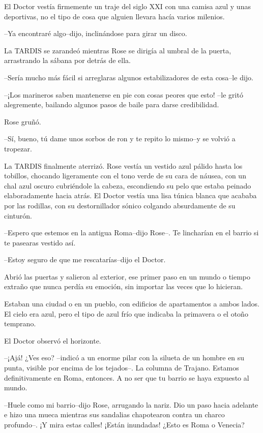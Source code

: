 El Doctor vestía firmemente un traje del siglo XXI con una camisa azul y
unas deportivas, no el tipo de cosa que alguien llevara hacía varios
milenios.

--Ya encontraré algo--dijo, inclinándose para girar un disco.

La TARDIS se zarandeó mientras Rose se dirigía al umbral de la puerta,
arrastrando la sábana por detrás de ella.

--Sería mucho más fácil si arreglaras algunos estabilizadores de esta
cosa--le dijo.

--¡Los marineros saben mantenerse en pie con cosas peores que esto! --le
gritó alegremente, bailando algunos pasos de baile para darse
credibilidad.

Rose gruñó.

--Sí, bueno, tú dame unos sorbos de ron y te repito lo mismo--y se
volvió a tropezar.

La TARDIS finalmente aterrizó. Rose vestía un vestido azul pálido hasta
los tobillos, chocando ligeramente con el tono verde de su cara de
náusea, con un chal azul oscuro cubriéndole la cabeza, escondiendo su
pelo que estaba peinado elaboradamente hacia atrás. El Doctor vestía una
lisa túnica blanca que acababa por las rodillas, con su destornillador
sónico colgando absurdamente de su cinturón.

--Espero que estemos en la antigua Roma--dijo Rose--. Te lincharían en
el barrio si te pasearas vestido así.

--Estoy seguro de que me rescatarías--dijo el Doctor.

Abrió las puertas y salieron al exterior, ese primer paso en un mundo o
tiempo extraño que nunca perdía su emoción, sin importar las veces que
lo hicieran.

Estaban una ciudad o en un pueblo, con edificios de apartamentos a ambos
lados. El cielo era azul, pero el tipo de azul frío que indicaba la
primavera o el otoño temprano.

El Doctor observó el horizonte.

--¡Ajá! ¿Ves eso? --indicó a un enorme pilar con la silueta de un hombre
en su punta, visible por encima de los tejados--. La columna de Trajano.
Estamos definitivamente en Roma, entonces. A no ser que tu barrio se
haya expuesto al mundo.

--Huele como mi barrio--dijo Rose, arrugando la nariz. Dio un paso hacia
adelante e hizo una mueca mientras sus sandalias chapotearon contra un
charco profundo--. ¡Y mira estas calles! ¡Están inundadas! ¿Esto es Roma
o Venecia?

